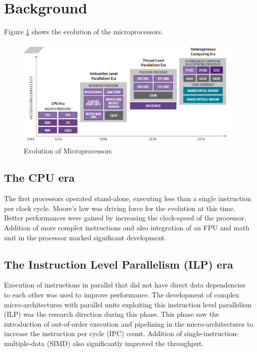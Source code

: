 \section{Background}
\label{background}

Figure \ref{fig:hsa} shows the evolution of the microprocessors.
\begin{figure}[t]
  \includegraphics[width=\linewidth]{hsa}
  \caption{Evolution of Microprocessors}
  \label{fig:hsa}
\end{figure}

\subsection{The CPU era} The first processors operated stand-alone, executing
less than a single instruction per clock cycle. Moore's law was driving force
for the evolution at this time. Better performances were gained by increasing
the clock-speed of the processor. Addition of more complex instructions and
also integration of an FPU and math unit in the processor marked significant
development.

\subsection{The Instruction Level Parallelism (ILP) era} Execution of
instructions in parallel that did not have direct data dependencies to each
other was used to improve performance. The development of complex
micro-architectures with parallel units exploiting this instruction level
parallelism (ILP) was the research direction during this phase. This phase saw
the introduction of out-of-order execution and pipelining in the
micro-architectures to increase the instruction per cycle (IPC) count. Addition
of single-instruction-multiple-data (SIMD) also significantly improved the
throughput.

